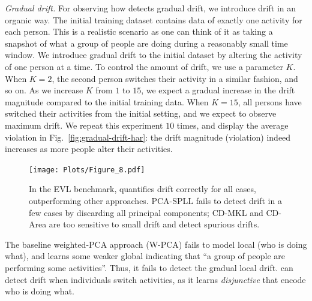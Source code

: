\noindent \emph{Gradual drift.}  For observing how \system detects
gradual drift, we introduce drift in an organic way. The initial training
dataset contains data of exactly one activity for each person. This is a
realistic scenario as one can think of it as taking a snapshot of what a group
of people are doing during a reasonably small time window. We introduce gradual
drift to the initial dataset by altering the activity of one person at a time.
To control the amount of drift, we use a parameter $K$.  When $K = 2$, the
second person switches their activity in a similar fashion, and so on. As we
increase $K$ from $1$ to $15$, we expect a gradual increase in the drift
magnitude compared to the initial training data. When $K = 15$, all persons
have switched their activities from the initial setting, and we expect to
observe maximum drift. We repeat this experiment $10$ times, and display the
average \invariant violation in Fig.~\ref{fig:gradual-drift-har}: the drift
magnitude (violation) indeed increases as more people alter their activities.

\begin{figure}[t]
	\centering	
	\texttt{[image: Plots/Figure\_8.pdf]}	
		\vspace{-5mm}
	 \caption{In the EVL benchmark, \system quantifies drift correctly for all
	 cases, outperforming other approaches. PCA-SPLL fails to detect drift in a few cases by
 	 discarding all principal components; CD-MKL and CD-Area are too sensitive to
 	 small drift and detect spurious drifts.}
	\vspace{-2mm}
	\label{fig:drift-baseline-comparison-EVL}
\end{figure}

The baseline weighted-PCA approach (W-PCA) fails to model local \invariants
(who is doing what), and learns some weaker global \invariants indicating that
``a group of people are performing some activities''. Thus, it fails to detect
the gradual local drift. \system can detect drift when individuals switch
activities, as it learns \emph{disjunctive} \invariants that encode who is
doing what.

\smallskip


